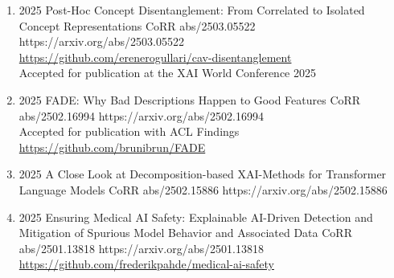 {\begin{enumerate}
        \item {}
                        {2025}
                        {Post-Hoc Concept Disentanglement: From Correlated to Isolated Concept Representations}
                        {CoRR abs/2503.05522}
                        {https://arxiv.org/abs/2503.05522}
                        {
                            \\\href{https://github.com/erenerogullari/cav-disentanglement}{https://github.com/erenerogullari/cav-disentanglement}
                            \\ Accepted for publication at the XAI World Conference 2025
                        }
        
        
        \item {}
                        {2025}
                        {FADE: Why Bad Descriptions Happen to Good Features}
                        {CoRR abs/2502.16994}
                        {https://arxiv.org/abs/2502.16994}
                        {
                            \\Accepted for publication with ACL Findings
                            \\\href{https://github.com/brunibrun/FADE}{https://github.com/brunibrun/FADE}
                        }
                        
                        
        \item {}
                        {2025}
                        {A Close Look at Decomposition-based XAI-Methods for Transformer Language Models}
                        {CoRR abs/2502.15886}
                        {https://arxiv.org/abs/2502.15886}

       
        \item {}
                        {2025}
                        {Ensuring Medical AI Safety: Explainable AI-Driven Detection and Mitigation of Spurious Model Behavior and Associated Data}
                        {CoRR abs/2501.13818}
                        {https://arxiv.org/abs/2501.13818}
                        {
                            \\\href{https://github.com/frederikpahde/medical-ai-safety}{https://github.com/frederikpahde/medical-ai-safety}
                        }


\end{enumerate}}
